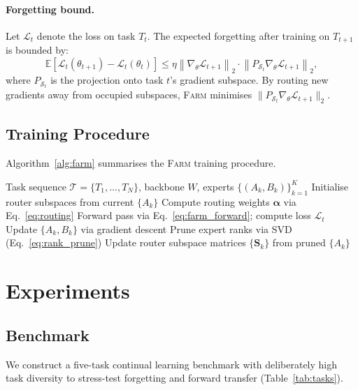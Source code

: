 \documentclass{article}
\newcommand{\FARM}{\textsc{Farm}}
\begin{document}
\paragraph{Forgetting bound.}
Let $\mathcal{L}_t$ denote the loss on task $T_t$. The expected forgetting after training on $T_{t+1}$ is bounded by:
\begin{equation}
    \mathbb{E}\left[\mathcal{L}_t(\theta_{t+1}) - \mathcal{L}_t(\theta_t)\right] \leq \eta \left\| \nabla_\theta \mathcal{L}_{t+1} \right\|_2 \cdot \left\| P_{\mathcal{S}_t} \nabla_\theta \mathcal{L}_{t+1} \right\|_2,
    \label{eq:bound}
\end{equation}
where $P_{\mathcal{S}_t}$ is the projection onto task $t$'s gradient subspace. By routing new gradients away from occupied subspaces, \FARM{} minimises $\|P_{\mathcal{S}_t} \nabla_\theta \mathcal{L}_{t+1}\|_2$.

\subsection{Training Procedure}
Algorithm~\ref{alg:farm} summarises the \FARM{} training procedure.

\begin{algorithm}[h]
\caption{\FARM{} Continual Training}
\label{alg:farm}
\begin{algorithmic}[1]
\Require Task sequence $\mathcal{T} = \{T_1, \ldots, T_N\}$, backbone $W$, experts $\{(A_k, B_k)\}_{k=1}^K$
    \State Initialise router subspaces from current $\{A_k\}$
        \State Compute routing weights $\bm{\alpha}$ via Eq.~\eqref{eq:routing}
        \State Forward pass via Eq.~\eqref{eq:farm_forward}; compute loss $\mathcal{L}_t$
        \State Update $\{A_k, B_k\}$ via gradient descent
    \EndFor
    \State Prune expert ranks via SVD (Eq.~\eqref{eq:rank_prune})
    \State Update router subspace matrices $\{\mathbf{S}_k\}$ from pruned $\{A_k\}$
\EndFor
\end{algorithmic}
\end{algorithm}

\section{Experiments}
\label{sec:experiments}

\subsection{Benchmark}
We construct a five-task continual learning benchmark with deliberately high task diversity to stress-test forgetting and forward transfer (Table~\ref{tab:tasks}).
\end{document}
